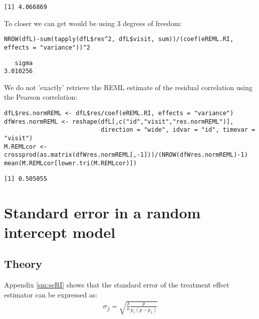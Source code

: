 \documentclass[12pt]{article}
\begin{document}
\begin{verbatim}
[1] 4.066869
\end{verbatim}


To closer we can get would be using 3 degrees of freedom:
\lstset{language=r,label= ,caption= ,captionpos=b,numbers=none}
\begin{lstlisting}
NROW(dfL)-sum(tapply(dfL$res^2, dfL$visit, sum))/(coef(eREML.RI, effects = "variance"))^2
\end{lstlisting}

\begin{verbatim}
   sigma 
3.010256
\end{verbatim}



We do not 'exactly' retrieve the REML estimate of the residual
correlation using the Pearson correlation:
\lstset{language=r,label= ,caption= ,captionpos=b,numbers=none}
\begin{lstlisting}
dfL$res.normREML <- dfL$res/coef(eREML.RI, effects = "variance")
dfWres.normREML <- reshape(dfL[,c("id","visit","res.normREML")],
                           direction = "wide", idvar = "id", timevar = "visit")
M.REMLcor <- crossprod(as.matrix(dfWres.normREML[,-1]))/(NROW(dfWres.normREML)-1)
mean(M.REMLcor[lower.tri(M.REMLcor)])
\end{lstlisting}

\begin{verbatim}
[1] 0.505055
\end{verbatim}


\clearpage

\section{Standard error in a random intercept model}
\label{sec:orgab137fa}

\subsection{Theory}
\label{sec:org36aa148}

Appendix \ref{sm:seRI} shows that the standard error of the treatment
effect estimator can be expressed as:
\begin{align*}
\sigma_{\widehat{\beta}} =\sqrt{\frac{\delta}{n} \frac{p}{p_1(p-p_1)}}
\end{align*}
\end{document}

